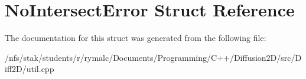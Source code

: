 \hypertarget{structNoIntersectError}{
\section{NoIntersectError Struct Reference}
\label{structNoIntersectError}
}


The documentation for this struct was generated from the following file:\begin{DoxyCompactItemize}
\item 
/nfs/stak/students/r/rymalc/Documents/Programming/C++/Diffusion2D/src/Diff2D/util.cpp\end{DoxyCompactItemize}
